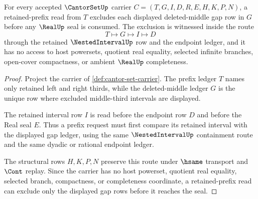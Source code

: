 \begin{theorem}
\label{thm:cantor-set-prefix-gap-separation}
For every accepted $\CantorSetUp$ carrier $C=(T,G,I,D,R,E,H,K,P,N)$, a retained-prefix read from $T$ excludes each displayed deleted-middle gap row in $G$ before any $\RealUp$ seal is consumed. The exclusion is witnessed inside the route
$$
T \longmapsto G \longmapsto I \longmapsto D
$$
through the retained $\NestedIntervalUp$ row and the endpoint ledger, and it has no access to host powersets, quotient real equality, selected infinite branches, open-cover compactness, or ambient $\RealUp$ completeness.
\end{theorem}
\begin{proof}
Project the carrier of \autoref{def:cantor-set-carrier}. The prefix ledger $T$ names only retained left and right thirds, while the deleted-middle ledger $G$ is the unique row where excluded middle-third intervals are displayed.

The retained interval row $I$ is read before the endpoint row $D$ and before the Real seal $E$. Thus a prefix request must first compare its retained interval with the displayed gap ledger, using the same $\NestedIntervalUp$ containment route and the same dyadic or rational endpoint ledger.

The structural rows $H,K,P,N$ preserve this route under $\hsame$ transport and $\Cont$ replay. Since the carrier has no host powerset, quotient real equality, selected branch, compactness, or completeness coordinate, a retained-prefix read can exclude only the displayed gap rows before it reaches the seal.
\end{proof}

